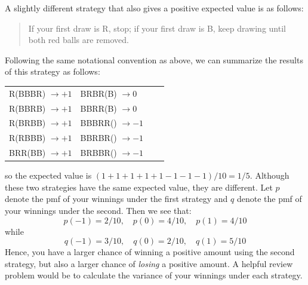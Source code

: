 \documentclass[addpoints,12pt]{exam}\usepackage[]{graphicx}\usepackage[]{xcolor}
\begin{document}
\begin{questions}
\begin{solution}
  A slightly different strategy that also gives a positive expected value is as follows: 
  \begin{quote}
    If your first draw is R, stop; if your first draw is B, keep drawing until both red balls are removed.
  \end{quote}
  Following the same notational convention as above, we can summarize the results of this strategy as follows:
  \begin{center}
    \begin{tabular}[h]{llll}
      R(BBBR) $\rightarrow +1$& BRBR(B) $\rightarrow 0$\\
      R(BBRB) $\rightarrow +1$& BBRR(B) $\rightarrow 0$\\
      R(BRBB) $\rightarrow +1$& BBBRR() $\rightarrow -1$\\
      R(RBBB) $\rightarrow +1$& BBRBR() $\rightarrow -1$\\
      BRR(BB) $\rightarrow +1$& BRBBR() $\rightarrow -1$
    \end{tabular}
  \end{center}
  so the expected value is $(1 + 1 + 1 + 1 + 1 - 1 - 1 - 1)/10 = 1/5$.
  Although these two strategies have the same expected value, they are different. 
  Let $p$ denote the pmf of your winnings under the first strategy and $q$ denote the pmf of your winnings under the second.
  Then we see that:
  \[
    p(-1) = 2/10, \quad p(0) = 4/10, \quad p(1) = 4/10
  \]
  while 
  \[
    q(-1) = 3/10, \quad q(0) = 2/10, \quad q(1) = 5/10
  \]
  Hence, you have a larger chance of winning a positive amount using the second strategy, but also a larger chance of \emph{losing} a positive amount.
  A helpful review problem would be to calculate the variance of your winnings under each strategy.
  
  \end{solution}


\end{questions}
\end{document}
